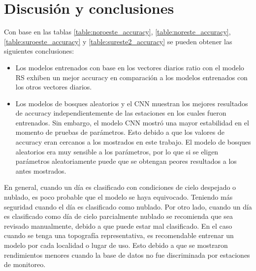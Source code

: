 \section{Discusión y conclusiones}

Con base en las tablas \ref{table:noroeste_accuracy}, \ref{table:noreste_accuracy}, \ref{table:suroeste_accuracy} y \ref{table:sureste2_accuracy} se pueden obtener las siguientes conclusiones:
\begin{itemize}
	\item Los modelos entrenados con base en los vectores diarios ratio con el modelo RS exhiben un mejor accuracy en comparación a los modelos entrenados con los otros vectores diarios.
	\item Los modelos de bosques aleatorios y el CNN muestran los mejores resultados de accuracy independientemente de las estaciones en los cuales fueron entrenados. Sin embargo, el modelo CNN mostró una mayor estabilidad en el momento de pruebas de parámetros. Esto debido a que los valores de accuracy eran cercanos a los mostrados en este trabajo. El modelo de bosques aleatorios era muy sensible a los parámetros, por lo que si se eligen parámetros aleatoriamente puede que se obtengan peores resultados a los antes mostrados.
\end{itemize}
En general, cuando un día es clasificado con condiciones de cielo despejado o nublado, es poco probable que el modelo se haya equivocado. Teniendo más seguridad cuando el día es clasificado como nublado. Por otro lado, cuando un día es clasificado como día de cielo parcialmente nublado se recomienda que sea revisado manualmente, debido a que puede estar mal clasificado. En el caso cuando se tenga una topografía representativa, es recomendable entrenar un modelo por cada localidad o lugar de uso. Esto debido a que se mostraron rendimientos menores cuando la base de datos no fue discriminada por estaciones de monitoreo.
